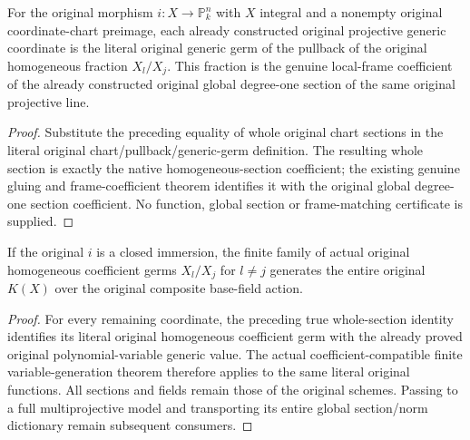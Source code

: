 \begin{theorem}
\label{thm:seven-original-projective-homogeneous-germ-route}
\leanok
{}
For the original morphism $i:X\to\mathbb P^n_k$ with $X$ integral
and a nonempty original coordinate-chart preimage, each already
constructed original projective generic coordinate is the literal
original generic germ of the pullback of the original homogeneous
fraction $X_l/X_j$. This fraction is the genuine local-frame
coefficient of the already constructed original global degree-one
section of the same original projective line.
\end{theorem}
\begin{proof}
Substitute the preceding equality of whole original chart sections
in the literal original chart/pullback/generic-germ definition. The
resulting whole section is exactly the native homogeneous-section
coefficient; the existing genuine gluing and frame-coefficient theorem
identifies it with the original global degree-one section coefficient.
No function, global section or frame-matching certificate is supplied.
\end{proof}

\begin{theorem}
\label{thm:seven-original-projective-homogeneous-generation-route}
\leanok
{}
If the original $i$ is a closed immersion, the finite family of actual
original homogeneous coefficient germs $X_l/X_j$ for $l\ne j$
generates the entire original $K(X)$ over the original composite
base-field action.
\end{theorem}
\begin{proof}
For every remaining coordinate, the preceding true whole-section
identity identifies its literal original homogeneous coefficient germ
with the already proved original polynomial-variable generic value.
The actual coefficient-compatible finite variable-generation theorem
therefore applies to the same literal original functions. All sections
and fields remain those of the original schemes. Passing to a full
multiprojective model and transporting its entire global section/norm
dictionary remain subsequent consumers.
\end{proof}
